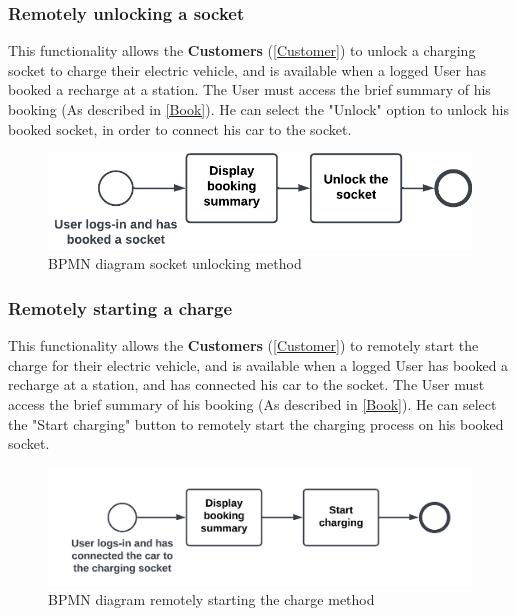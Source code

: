 \subsubsection{Remotely unlocking a socket}
This functionality allows the \textbf{Customers} (\ref{Customer}) to unlock a charging socket to charge their electric vehicle, and is available when a logged User has booked a recharge at a station. 
The User must access the brief summary of his booking (As described in \ref{Book}).
He can select the "Unlock" option to unlock his booked socket, in order to connect his car to the socket.
\begin{figure}[H]
    \begin{center}
        \includegraphics[scale=0.3]{img/fun-sock-unl.png}
        \caption{BPMN diagram socket unlocking method}
    \end{center}
\end{figure}
\subsubsection{Remotely starting a charge}
This functionality allows the \textbf{Customers} (\ref{Customer}) to remotely start the charge for their electric vehicle, and is available when a logged User has booked a recharge at a station, and has connected his car to the socket. 
The User must access the brief summary of his booking (As described in \ref{Book}).
He can select the "Start charging" button to remotely start the charging process on his booked socket.
\begin{figure}[H]
    \begin{center}
        \includegraphics[scale=0.2]{img/fun-rem-ch.png}
        \caption{BPMN diagram remotely starting the charge method}
    \end{center}
\end{figure}
